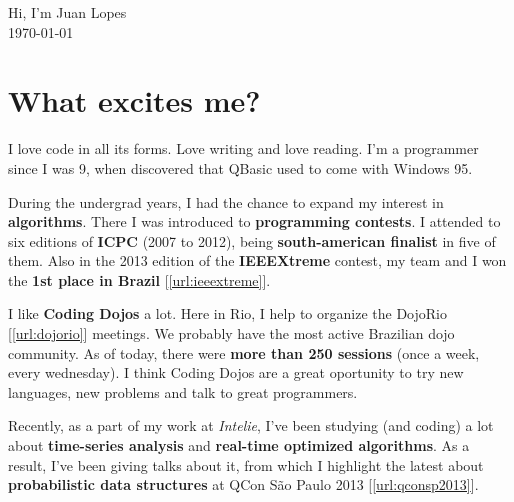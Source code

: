\documentclass[a4paper,12pt,oneside]{article}
\begin{document}
\author{Juan Lopes}

\begin{center}
	{\huge Hi, I'm Juan Lopes} \\[0.5cm]

	{\large \today}
\end{center}


\renewcommand{\abstractname}{}
\begin{abstract}
\noindent \begin{center}\textit{
Brazilian, lives in Rio de Janeiro. \\
Interested in algorithms, optimization, programming contests and serif typefaces. \\
B.S. in Computer Science; M.S. candidate in Computer Science. \\
Writes high-performance Java code at Intelie for the last 3  years. \\
Wrote beautiful C\# code at Living Consultoria for almost 4 years before.
}
\end{center}
\end{abstract}


\section*{What excites me?}

	I love code in all its forms. Love writing and love reading. I'm a programmer
	since I was 9, when discovered that QBasic used to come with Windows 95.

	During the undergrad years, I had the chance to expand my interest in
	\textbf{algorithms}. There I was introduced to \textbf{programming contests}. I
	attended to six editions of \textbf{ICPC} (2007 to 2012), being
	\textbf{south-american finalist} in five of them. Also in the 2013 edition of
	the \textbf{IEEEXtreme} contest, my team and I won the \textbf{1st place in
	Brazil} [\ref{url:ieeextreme}].

	I like \textbf{Coding Dojos} a lot. Here in Rio, I help to organize the DojoRio
	[\ref{url:dojorio}] meetings. We probably have the most active Brazilian dojo
	community. As of today, there were \textbf{more than 250 sessions} (once a
	week, every wednesday). I think Coding Dojos are a great oportunity to try new
	languages, new problems and talk to great programmers.

	Recently, as a part of my work at \emph{Intelie}, I've been studying (and
	coding) a lot about \textbf{time-series analysis} and \textbf{real-time
	optimized algorithms}. As a result, I've been giving talks about it, from which
	I highlight the latest about \textbf{probabilistic data structures} at QCon São
	Paulo 2013 [\ref{url:qconsp2013}].
\end{document}
